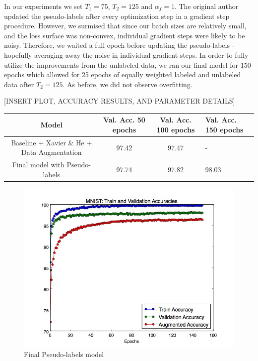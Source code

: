 \documentclass[a4paper]{article}
\begin{document}
\begin{enumerate}
{\newline
\newline
In our experiments we set $T_1 = 75$, $T_2 = 125$ and $\alpha_f = 1$. The original author updated the pseudo-labels after every optimization step in a gradient step procedure. However, we surmised that since our batch sizes are relatively small, and the loss surface was non-convex, individual gradient steps were likely to be noisy. Therefore, we waited a full epoch before updating the pseudo-labels - hopefully averaging away the noise in individual gradient steps. 
\newline
\newline
In order to fully utilize the improvements from the unlabeled data, we ran our final model for 150 epochs which allowed for 25 epochs of equally weighted labeled and unlabeled data after $T_2 = 125$. As before, we did not observe overfitting.

[INSERT PLOT, ACCURACY RESULTS, AND PARAMETER DETAILS]

\begin{center}
\begin{tabular}{ |c|c|c| } 
 \hline
 Model & Val. Acc. 50 epochs & Val. Acc. 100 epochs & Val. Acc. 150 epochs \\ \hline
 Baseline + Xavier \& He + Data Augmentation & 97.42 & 97.47 & - \\ 
 Final model with Pseudo-labels & 97.74 & 97.82 & 98.03
 \hline
\end{tabular}
\end{center}


\begin{figure}[H]
  \includegraphics[width=12cm]{../plots/final_model_accuracies.jpg}
  \centering
  \caption{Final Pseudo-labels model}
  \label{fig:boat1}
\end{figure}

}
\end{enumerate}
\end{document}
